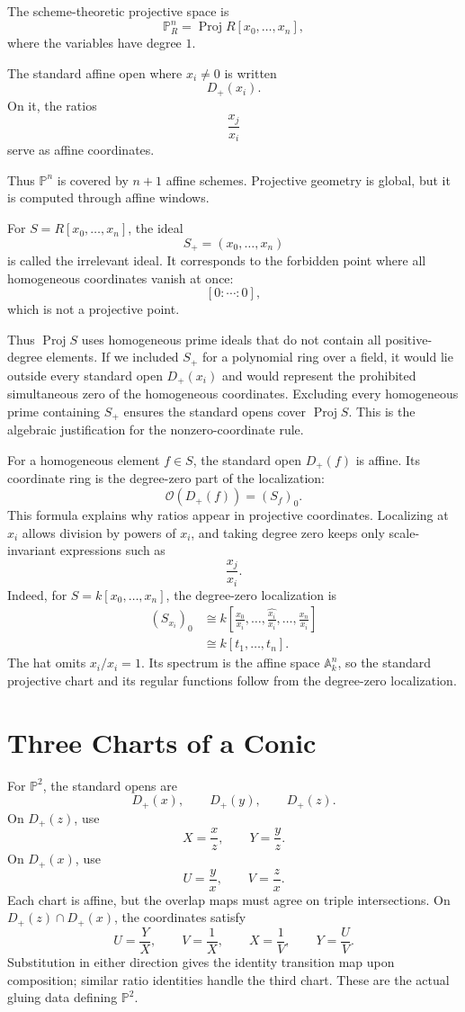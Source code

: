 The scheme-theoretic projective space is
\[
  \mathbb P^n_R=\operatorname{Proj}R[x_0,\ldots,x_n],
\]
where the variables have degree \(1\).

The standard affine open where \(x_i\ne0\) is written
\[
  D_+(x_i).
\]
On it, the ratios
\[
  \frac{x_j}{x_i}
\]
serve as affine coordinates.

Thus \(\mathbb P^n\) is covered by \(n+1\) affine schemes. Projective geometry is global, but it is computed through affine windows.

For \(S=R[x_0,\ldots,x_n]\), the ideal
\[
  S_+=(x_0,\ldots,x_n)
\]
is called the irrelevant ideal.  It corresponds to the forbidden point where all homogeneous coordinates vanish at once:
\[
  [0:\cdots:0],
\]
which is not a projective point.

Thus \(\operatorname{Proj}S\) uses homogeneous prime ideals that do not contain all positive-degree elements.  If we included \(S_+\) for a polynomial ring over a field, it would lie outside every standard open \(D_+(x_i)\) and would represent the prohibited simultaneous zero of the homogeneous coordinates. Excluding every homogeneous prime containing \(S_+\) ensures the standard opens cover \(\operatorname{Proj}S\). This is the algebraic justification for the nonzero-coordinate rule.

For a homogeneous element \(f\in S\), the standard open \(D_+(f)\) is affine.  Its coordinate ring is the degree-zero part of the localization:
\[
  \mathcal O(D_+(f))=(S_f)_0.
\]
This formula explains why ratios appear in projective coordinates.  Localizing at \(x_i\) allows division by powers of \(x_i\), and taking degree zero keeps only scale-invariant expressions such as
\[
  \frac{x_j}{x_i}.
\]
Indeed, for \(S=k[x_0,\ldots,x_n]\), the degree-zero localization is
\[
\begin{aligned}
 (S_{x_i})_0
 &\cong k\left[
 \frac{x_0}{x_i},\ldots,
 \widehat{\frac{x_i}{x_i}},\ldots,
 \frac{x_n}{x_i}\right]\\
 &\cong k[t_1,\ldots,t_n].
\end{aligned}
\]
The hat omits \(x_i/x_i=1\). Its spectrum is the affine space \(\mathbb A^n_k\), so the standard projective chart and its regular functions follow from the degree-zero localization.

\section{Three Charts of a Conic}

For \(\mathbb P^2\), the standard opens are
\[
  D_+(x),
  \qquad
  D_+(y),
  \qquad
  D_+(z).
\]
On \(D_+(z)\), use
\[
  X=\frac{x}{z},
  \qquad
  Y=\frac{y}{z}.
\]
On \(D_+(x)\), use
\[
  U=\frac{y}{x},
  \qquad
  V=\frac{z}{x}.
\]
Each chart is affine, but the overlap maps must agree on triple intersections. On \(D_+(z)\cap D_+(x)\), the coordinates satisfy
\[
  U=\frac{Y}{X},\qquad V=\frac1X,
  \qquad X=\frac1V,\qquad Y=\frac UV.
\]
Substitution in either direction gives the identity transition map upon composition; similar ratio identities handle the third chart. These are the actual gluing data defining \(\mathbb P^2\).

